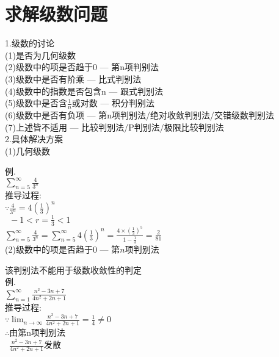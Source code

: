 \chapter{求解级数问题}
1.级数的讨论\\
(1)是否为几何级数\\
(2)级数中的项是否趋于0 --- 第n项判别法\\
(3)级数中是否有阶乘 --- 比式判别法\\
(4)级数中的指数是否包含n --- 跟式判别法\\
(5)级数中是否含$\frac{1}{n}$或对数 --- 积分判别法\\
(6)级数中是否有负项 --- 第n项判别法/绝对收敛判别法/交错级数判别法\\
(7)上述皆不适用 --- 比较判别法/P判别法/极限比较判别法\\[2ex]

2.具体解决方案\\
(1)几何级数
{\par\centering
{}}

例.\\
$\displaystyle\sum_{n=5}^{\infty}\frac{4}{3^n}$\\[1ex]
推导过程:\\
$\displaystyle\because\frac{4}{3^n}=4(\frac{1}{3})^n$\\
$\displaystyle\phantom{\because}-1<r=\frac{1}{3}<1$\\
$\displaystyle\sum_{n=5}^{\infty}\frac{4}{3^n}=\sum_{n=5}^{\infty}4(\frac{1}{3})^n=\frac{4\times(\frac{1}{3})^5}{1-\frac{1}{3}}=\frac{2}{81}$\\[2ex]

(2)级数中的项是否趋于$0$ --- 第$n$项判别法
{\par\centering
{}}

该判别法不能用于级数收敛性的判定\\
例.\\
$\displaystyle\sum_{n=1}^{\infty}\frac{n^2-3n+7}{4n^2+2n+1}$\\[1ex]
推导过程:\\
$\displaystyle\because\lim_{n\to\infty}\frac{n^2-3n+7}{4n^2+2n+1}=\frac{1}{4}\neq 0$\\
$\therefore$由第n项判别法\\
$\displaystyle\phantom{\therefore}\frac{n^2-3n+7}{4n^2+2n+1}$发散\\[2ex]

